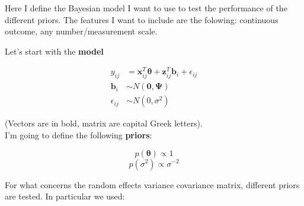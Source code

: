 \documentclass[a4paper]{article}
\begin{document}
Here I define the Bayesian model I want to use to test the performance of the different priors. The features I want to include are the folowing: continuous outcome, any number/measurement scale.

Let's start with the \textbf{model}

\begin{equation}
 \begin{split}
	y_{ij}& = \bm{x}^{T}_{ij} \bm{\theta} + \bm{z}^{T}_{ij}\bm{b}_i + \epsilon_{ij}\\
	\bm{b}_i& \sim N(\bm{0}, \bm{\Psi})\\
	\epsilon_{ij}& \sim N(0, \sigma^2)
 \end{split}
\end{equation}

(Vectors are in bold, matrix are capital Greek letters).\\
I'm going to define the following \textbf{priors}:

\begin{equation}
p(\bm{\theta}) \propto 1
\end{equation}
\begin{equation}
p(\sigma^2) \propto \sigma^{-2}
\end{equation}

For what concerns the random effects variance covariance matrix, different priors are tested. In particular we used:
\end{document}
